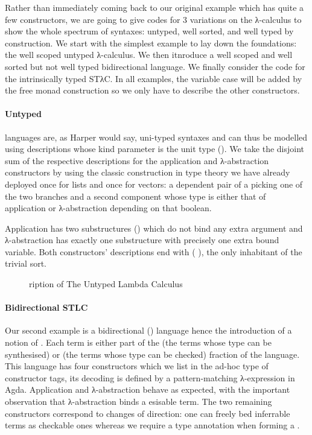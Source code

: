 Rather than immediately coming back to our original example which has quite
a few constructors, we are going to give codes for 3 variations on the
λ-calculus to show the whole spectrum of syntaxes: untyped, well sorted,
and well typed by construction.
%
We start with the simplest example to lay down the foundations: the well
scoped untyped λ-calculus.
%
We then itnroduce a well scoped and well sorted but not well typed
bidirectional language.
%
We finally consider the code for the intrinsically typed STλC.
%
In all examples, the variable case will be added by the free monad
construction so we only have to describe the other constructors.

\paragraph{Untyped} languages are, as Harper would say, uni-typed syntaxes and
can thus be modelled using descriptions whose kind parameter is the unit type
().
%
We take the disjoint sum of the respective descriptions for the application
and λ-abstraction constructors by using the classic construction in type
theory we have already deployed once for lists and once for vectors: a
dependent pair of a  picking one of the two branches and a second
component whose type is either that of application or λ-abstraction depending
on that boolean.

Application has two substructures () which do not bind any extra
argument and λ-abstraction has exactly one substructure with precisely
one extra bound variable. Both constructors' descriptions end with
( ), the only inhabitant of the trivial sort.

\begin{figure}[h]
\caption{ription of The Untyped Lambda Calculus
\label{fig:desculc}\label{fig:descUTLC}}
\end{figure}

\paragraph{Bidirectional STLC}\label{par:bidirectional} Our second example
is a bidirectional (\cite{pierce2000local}) language hence the introduction
of a notion of . Each term is either part of the  (the
terms whose type can be synthesised) or  (the terms whose type
can be checked) fraction of the language.
%
This language has four constructors
which we list in the ad-hoc  type of constructor tags, its
decoding  is defined by a pattern-matching λ-expression in Agda.
Application and λ-abstraction behave as expected, with the important
observation that λ-abstraction binds a esisable term. The two
remaining constructors correspond to changes of direction: one can freely
bed inferrable terms as checkable ones whereas we require a type
annotation when forming a .

